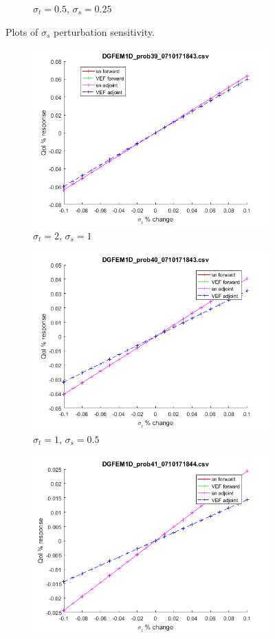 \documentclass{article}
\newcommand{\sigt}{\sigma_t}
\newcommand{\sigs}{\sigma_s}
\begin{document}
\begin{figure}[H]
\begin{subfigure}{.5\textwidth}
  \caption{$\sigt=0.5$, $\sigs=0.25$}
  \label{fig:sfig3}
\end{subfigure}
\caption{Plots of $\sigs$ perturbation sensitivity.}
\label{fig:fig}
\end{figure}

\begin{figure}[H]
\label{InHomoPertq}
\begin{subfigure}{.5\textwidth}
  \centering
  \includegraphics[width=.8\linewidth]{figures/39qSens.png}
  \caption{$\sigt=2$, $\sigs=1$}
  \label{fig:sfig1}
\end{subfigure}%
\begin{subfigure}{.5\textwidth}
  \centering
  \includegraphics[width=.8\linewidth]{figures/40qSens.png}
  \caption{$\sigt=1$, $\sigs=0.5$}
  \label{fig:sfig2}
\end{subfigure}
\begin{subfigure}{.5\textwidth}
  \centering
  \includegraphics[width=.8\linewidth]{figures/41qSens.png}

\end{subfigure}
\end{figure}
\end{document}
